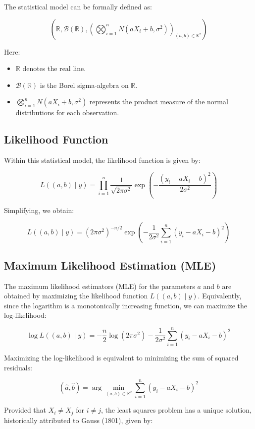 \documentclass[open=any, 11pt,paper=A4]{scrreprt}
\begin{document}
The statistical model can be formally defined as:

\[
(\mathbb{R}, \mathcal{B}(\mathbb{R}), \left(\bigotimes_{i=1}^n N(aX_i + b, \sigma^2)\right)_{(a,b) \in \mathbb{R}^2})
\]

Here:
\begin{itemize}
    \item \( \mathbb{R} \) denotes the real line.
    \item \( \mathcal{B}(\mathbb{R}) \) is the Borel sigma-algebra on \( \mathbb{R} \).
    \item \( \bigotimes_{i=1}^n N(aX_i + b, \sigma^2) \) represents the product measure of the normal distributions for each observation.
\end{itemize}

\subsection{Likelihood Function}

Within this statistical model, the likelihood function is given by:

\[
L((a,b) \mid y) = \prod_{i=1}^n \frac{1}{\sqrt{2\pi \sigma^2}} \exp\left( -\frac{(y_i - aX_i - b)^2}{2\sigma^2} \right)
\]

Simplifying, we obtain:

\[
L((a,b) \mid y) = (2\pi \sigma^2)^{-n/2} \exp\left( -\frac{1}{2\sigma^2} \sum_{i=1}^n (y_i - aX_i - b)^2 \right)
\]

\subsection{Maximum Likelihood Estimation (MLE)}

The maximum likelihood estimators (MLE) for the parameters \( a \) and \( b \) are obtained by maximizing the likelihood function \( L((a,b) \mid y) \). Equivalently, since the logarithm is a monotonically increasing function, we can maximize the log-likelihood:

\[
\log L((a,b) \mid y) = -\frac{n}{2} \log(2\pi \sigma^2) - \frac{1}{2\sigma^2} \sum_{i=1}^n (y_i - aX_i - b)^2
\]

Maximizing the log-likelihood is equivalent to minimizing the sum of squared residuals:

\[
(\hat{a}, \hat{b}) = \arg \min_{(a,b) \in \mathbb{R}^2} \sum_{i=1}^n (y_i - aX_i - b)^2
\]

Provided that \( X_i \neq X_j \) for \( i \neq j \), the least squares problem has a unique solution, historically attributed to Gauss (1801), given by:
\end{document}
